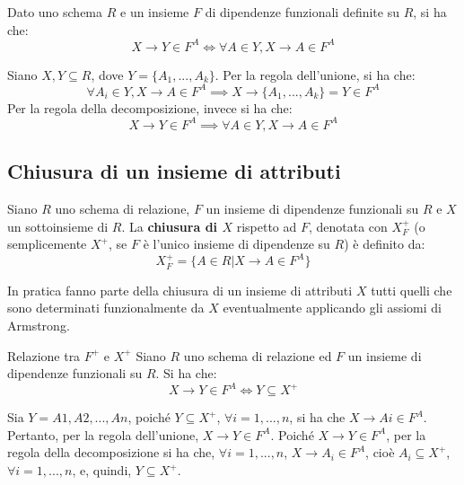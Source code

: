 \begin{Proposition}{}{}
    Dato uno schema $R$ e un insieme $F$ di dipendenze funzionali definite su $R$, si ha che:
    \begin{equation*}
        X \to Y \in F^A \iff \forall A \in Y, X \to A \in F^A
    \end{equation*}
    \begin{demonstration}
        Siano $X, Y \subseteq R$, dove $Y = \{A_1, . . . , A_k\}$. Per la regola dell'unione, si ha che:
        \begin{equation*}
            \forall A_i \in Y, X \to A \in F^A \implies X \to \{A_1, . . . , A_k\} = Y \in F^A
        \end{equation*}
        Per la regola della decomposizione, invece si ha che:
        \begin{equation*}
            X \to Y \in F^A \implies \forall A \in Y, X \to A \in F^A
        \end{equation*}
    \end{demonstration}
\end{Proposition}

\subsection{Chiusura di un insieme di attributi}
\begin{redbar}
    Siano $R$ uno schema di relazione, $F$ un insieme di dipendenze funzionali su $R$ e $X$ un sottoinsieme di $R$. La \textbf{chiusura di $X$} rispetto ad $F$, denotata con $X^+_F$ (o semplicemente $X^+$, se $F$ è l'unico insieme di dipendenze su $R$) è definito da:
    \begin{equation*}
        X^+_F=\{A\in R|X\to A\in F^A\}
    \end{equation*}
\end{redbar}

In pratica fanno parte della chiusura di un insieme di attributi $X$ tutti quelli che sono determinati funzionalmente da $X$ eventualmente applicando gli assiomi di Armstrong.

\begin{Lemma}{Relazione tra $F^+$ e $X^+$}{}\label{lemma:chiusura}
    Siano $R$ uno schema di relazione ed $F$ un insieme di dipendenze funzionali su $R$. Si ha che: 
    \begin{equation*}
        X\to Y\in F^A \iff Y\subseteq X^+    
    \end{equation*}
    \begin{demonstration}
        Sia $Y=A1, A2,..., An$, poiché $Y\subseteq X^+$, $\forall i=1,...,n$, si ha che $X\to Ai\in F^A$. Pertanto, per la regola dell'unione, $X\to Y\in F^A$. Poiché $X\to Y\in F^A$, per la regola della decomposizione si ha che, $\forall i=1,...,n$, $X\to A_i\in F^A$, cioè $A_i\subseteq X^+$, $\forall i=1,...,n$, e, quindi, $Y\subseteq X^+$.
    \end{demonstration}
\end{Lemma}

